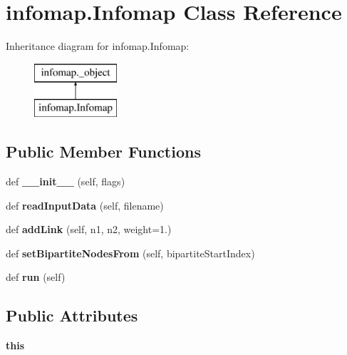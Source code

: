 \hypertarget{classinfomap_1_1Infomap}{}\section{infomap.\+Infomap Class Reference}
\label{classinfomap_1_1Infomap}
Inheritance diagram for infomap.\+Infomap\+:\begin{figure}[H]
\begin{center}
\leavevmode
\includegraphics[height=2.000000cm]{classinfomap_1_1Infomap}
\end{center}
\end{figure}
\subsection*{Public Member Functions}
\begin{DoxyCompactItemize}
\item 
\mbox{\label{classinfomap_1_1Infomap_a36c288524a95239e26cee502a71bb502}} 
def {\bfseries \+\_\+\+\_\+init\+\_\+\+\_\+} (self, flags)
\item 
\mbox{\label{classinfomap_1_1Infomap_a72377b53ca1c7b4263e9a1f0943d9be5}} 
def {\bfseries read\+Input\+Data} (self, filename)
\item 
\mbox{\label{classinfomap_1_1Infomap_ac92ee1ef7ee57609a4444122325daade}} 
def {\bfseries add\+Link} (self, n1, n2, weight=1.)
\item 
\mbox{\label{classinfomap_1_1Infomap_a85c5d42dbb2a269b1d89c8bb1e489d5b}} 
def {\bfseries set\+Bipartite\+Nodes\+From} (self, bipartite\+Start\+Index)
\item 
\mbox{\label{classinfomap_1_1Infomap_a9672b7e1c07434ff24948a7d2cc6b15f}} 
def {\bfseries run} (self)
\end{DoxyCompactItemize}
\subsection*{Public Attributes}
\begin{DoxyCompactItemize}
\item 
\mbox{\label{classinfomap_1_1Infomap_a240f90039ca029316f5f822223dbe915}} 
{\bfseries this}
\end{DoxyCompactItemize}
